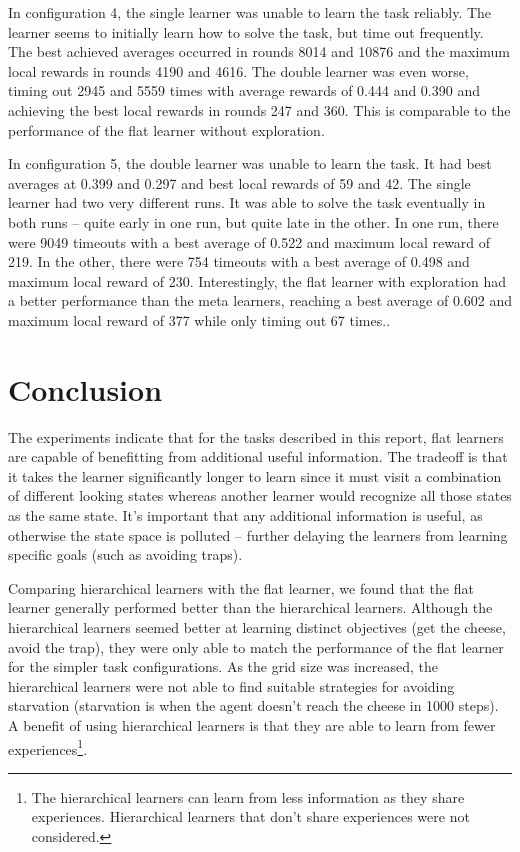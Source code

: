 \documentclass{article}
\begin{document}
	In configuration 4, the single learner was unable to learn the task reliably. The learner seems to initially learn how to solve the task, but time out frequently. The best achieved averages occurred in rounds 8014 and 10876 and the maximum local rewards in rounds 4190 and 4616.
	The double learner was even worse, timing out 2945 and 5559 times with average rewards of 0.444 and 0.390 and achieving the best local rewards in rounds 247 and 360. This is comparable to the performance of the flat learner without exploration.

	In configuration 5, the double learner was unable to learn the task. It had best averages at 0.399 and 0.297 and best local rewards of 59 and 42. The single learner had two very different runs. It was able to solve the task eventually in both runs -- quite early in one run, but quite late in the other. In one run, there were 9049 timeouts with a best average of 0.522 and maximum local reward of 219. In the other, there were 754 timeouts with a best average of 0.498 and maximum local reward of 230. Interestingly, the flat learner with exploration had a better performance than the meta learners, reaching a best average of 0.602 and maximum local reward of 377 while only timing out 67 times..

	\section{Conclusion}

	The experiments indicate that for the tasks described in this report, flat learners are capable of benefitting from additional useful information. The tradeoff is that it takes the learner significantly longer to learn since it must visit a combination of different looking states whereas another learner would recognize all those states as the same state. It's important that any additional information is useful, as otherwise the state space is polluted -- further delaying the learners from learning specific goals (such as avoiding traps).
	
	Comparing hierarchical learners with the flat learner, we found that the flat learner generally performed better than the hierarchical learners. Although the hierarchical learners seemed better at learning distinct objectives (get the cheese, avoid the trap), they were only able to match the performance of the flat learner for the simpler task configurations. As the grid size was increased, the hierarchical learners were not able to find suitable strategies for avoiding starvation (starvation is when the agent doesn't reach the cheese in 1000 steps).
	A benefit of using hierarchical learners is that they are able to learn from fewer experiences\footnote{The hierarchical learners can learn from less information as they share experiences. Hierarchical learners that don't share experiences were not considered.}.
\end{document}
